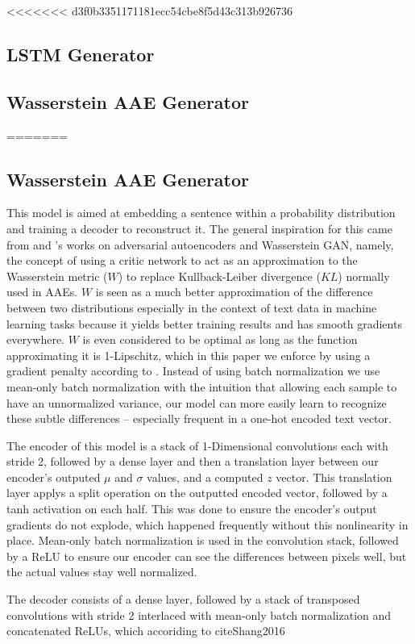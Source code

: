 \documentclass{article}
\begin{document}
<<<<<<< d3f0b3351171181ecc54cbe8f5d43c313b926736
	\subsection{LSTM Generator}
	\subsection{Wasserstein AAE Generator}
=======
	\subsection{Wasserstein AAE Generator}
		This model is aimed at embedding a sentence within a probability distribution
		and training a decoder to reconstruct it. The general inspiration for this came from
		\cite{Makhzani2015} and \cite{Arjovski2017}'s works on adversarial autoencoders and
		Wasserstein GAN, namely, the concept of using a critic network to act as an approximation
		to the Wasserstein metric ($W$) to replace Kullback-Leiber divergence ($KL$) normally used in AAEs.
		$W$ is seen as a much better approximation of the difference between two distributions
		especially in the context of text data in machine learning tasks because it yields
		better training results and has smooth gradients everywhere. $W$ is even considered to be optimal
		as long as the function approximating it is 1-Lipschitz, which in this paper we enforce
		by using a gradient penalty according to \cite{Gulrajani2017}. Instead of using
		batch normalization we use mean-only batch normalization with the intuition that
		allowing each sample to have an unnormalized variance, our model can more easily
		learn to recognize these subtle differences -- especially frequent in a one-hot encoded
		text vector.

		The encoder of this model is a stack of 1-Dimensional convolutions each with stride 2, followed by a dense layer
		and then a translation layer between our encoder's outputed $\mu$ and $\sigma$ values, and a computed $z$ vector.
		This translation layer applys a split operation on the outputted encoded vector, followed by a tanh activation
		on each half. This was done to ensure the encoder's output gradients do not explode, which happened
		frequently without this nonlinearity in place. Mean-only batch normalization is used in
		the convolution stack, followed by a ReLU to ensure our encoder can see the differences
		between pixels well, but the actual values stay well normalized.

		The decoder consists of a dense layer, followed by a stack of transposed convolutions with stride 2 interlaced
		with mean-only batch normalization and concatenated ReLUs, which accoriding to cite{Shang2016}
\end{document}
